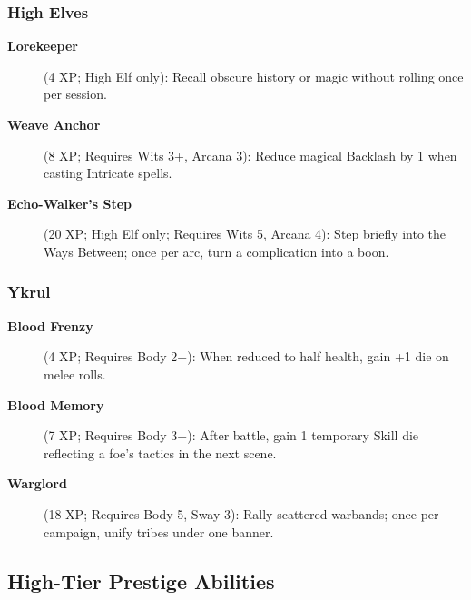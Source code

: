 \subsubsection{High Elves}
\label{subsubsec:high-elf-talents}

\begin{description}
\item[\textbf{Lorekeeper}] (4 XP; High Elf only): Recall obscure history or magic without rolling once per session.
\item[\textbf{Weave Anchor}] (8 XP; Requires Wits 3+, Arcana 3): Reduce magical Backlash by 1 when casting Intricate spells.
\item[\textbf{Echo-Walker's Step}] (20 XP; High Elf only; Requires Wits 5, Arcana 4): Step briefly into the Ways Between; once per arc, turn a complication into a boon.
\end{description}

\subsubsection{Ykrul}
\label{subsubsec:ykrul-talents}

\begin{description}
\item[\textbf{Blood Frenzy}] (4 XP; Requires Body 2+): When reduced to half health, gain +1 die on melee rolls.
\item[\textbf{Blood Memory}] (7 XP; Requires Body 3+): After battle, gain 1 temporary Skill die reflecting a foe's tactics in the next scene.
\item[\textbf{Warglord}] (18 XP; Requires Body 5, Sway 3): Rally scattered warbands; once per campaign, unify tribes under one banner.
\end{description}

\subsection{High-Tier Prestige Abilities}
\label{subsec:high-tier-prestige}

